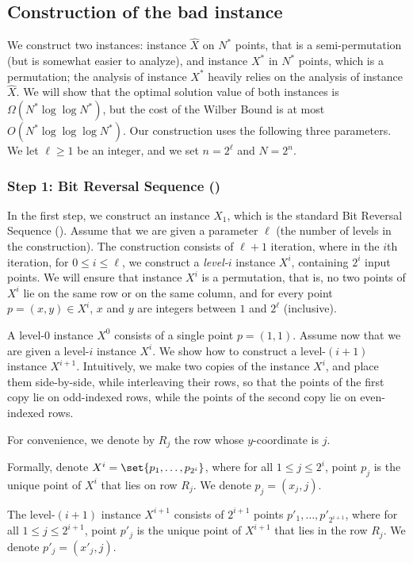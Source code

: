 \documentclass{toc}
\begin{document}
\subsection{Construction of the bad instance} 

\label{sec:construction}
We construct two instances: instance $\hat X$ on $N^*$ points, that is a semi-permutation (but is somewhat easier to analyze), and instance $X^*$ in $N^*$ points, which is a permutation; the analysis of instance $X^*$ heavily relies on the analysis of instance $\hat X$. 
We will show that the optimal solution value of both instances is $\Omega(N^*\log\log N^*)$, but the cost of the Wilber Bound is at most $O(N^*\log\log\log N^*)$.
Our construction uses the following three parameters. We let $\ell\geq 1$ be an integer, and we set $n=2^{\ell}$ and $N = 2^n$. 


\iffalse 


\subsubsection{Step 1: Bit Reversal Sequence (\BRS)}
In the first step, we construct an instance $X_1$, which is the standard Bit Reversal Sequence (\BRS). Assume that we are given a parameter $\ell$ (the number of levels in the construction). The construction consists of $\ell+1$ iteration, where in the $i$th iteration, for $0 \leq i\leq \ell$, we construct a \emph{level-$i$} instance $X^i$, containing $2^i$ input points. We will ensure that instance $X^i$ is a permutation, that is, no two points of $X^i$ lie on the same row or on the same column, and for every point $p=(x,y)\in X^i$, $x$ and $y$ are integers between $1$ and $2^{\ell}$ (inclusive).%

A level-$0$ instance $X^0$ consists of a single point $p=(1,1)$.
Assume now that we are given a level-$i$ instance $X^i$. We show how to construct a level-$(i+1)$ instance $X^{i+1}$.
Intuitively, we make two copies of the instance $X^i$, and place them side-by-side, while interleaving their rows, so that the points of the first copy lie on odd-indexed rows, while the points of the second copy lie on even-indexed rows.

For convenience, we denote by $R_j$ the row whose $y$-coordinate is $j$.

Formally, denote $X^i=\set{p_1,\ldots,p_{2^i}}$, where for all $1\leq j\leq 2^i$, point $p_j$ is the unique point of $X^i$ that lies on row $R_j$. We denote $p_j=(x_j,j)$.

The level-$(i+1)$ instance $X^{i+1}$ consists of $2^{i+1}$ points $p'_1,\ldots,p'_{2^{i+1}}$, where for all $1\leq j\leq 2^{i+1}$, point $p'_j$ is the unique point of $X^{i+1}$ that lies in the row $R_j$. We denote $p'_j=(x'_j,j)$.
\end{document}
